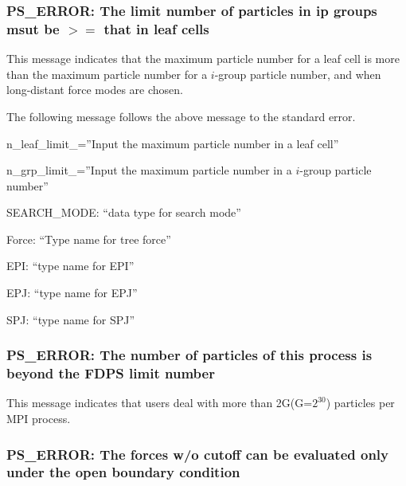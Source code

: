 \subsubsection{PS\_ERROR: The limit number of particles in ip groups msut be $>=$ that in leaf cells}

This message indicates that the maximum particle number for a leaf
cell is more than the maximum particle number for a $i$-group particle
number, and when long-distant force modes are chosen.

The following message follows the above message to the standard error.

\begin{screen}
  n\_leaf\_limit\_=''Input the maximum particle number in a leaf
  cell''

  n\_grp\_limit\_=''Input the maximum particle number in a $i$-group
  particle number''

  SEARCH\_MODE: ``data type for search mode''

  Force: ``Type name for tree force''

  EPI: ``type name for EPI''

  EPJ: ``type name for EPJ''

  SPJ: ``type name for SPJ''
  
\end{screen}

\subsubsection{PS\_ERROR: The number of particles of this process is beyond the FDPS limit number}

This message indicates that users deal with more than 2G(G=$2^{30}$)
particles per MPI process.

\subsubsection{PS\_ERROR: The forces w/o cutoff can be evaluated only under the open boundary condition}

